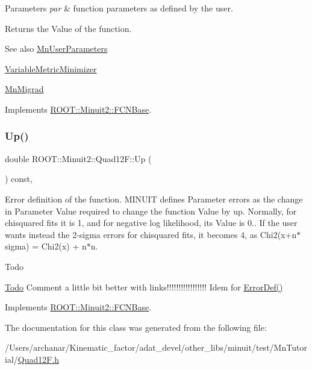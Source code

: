 \begin{DoxyParams}{Parameters}
{\em par} & function parameters as defined by the user.\\
\hline
\end{DoxyParams}
\begin{DoxyReturn}{Returns}
the Value of the function.
\end{DoxyReturn}
\begin{DoxySeeAlso}{See also}
\mbox{\hyperlink{classROOT_1_1Minuit2_1_1MnUserParameters}{Mn\+User\+Parameters}} 

\mbox{\hyperlink{classROOT_1_1Minuit2_1_1VariableMetricMinimizer}{Variable\+Metric\+Minimizer}} 

\mbox{\hyperlink{classROOT_1_1Minuit2_1_1MnMigrad}{Mn\+Migrad}} 
\end{DoxySeeAlso}


Implements \mbox{\hyperlink{classROOT_1_1Minuit2_1_1FCNBase_ae4a86bd94d0d0f5ca6fc8f8ab2bb43cd}{R\+O\+O\+T\+::\+Minuit2\+::\+F\+C\+N\+Base}}.

\mbox{\label{classROOT_1_1Minuit2_1_1Quad12F_afbb216349fbceafc530845fe1cff5af4}} 
\subsubsection{\texorpdfstring{Up()}{Up()}}
{\footnotesize\ttfamily double R\+O\+O\+T\+::\+Minuit2\+::\+Quad12\+F\+::\+Up (\begin{DoxyParamCaption}{ }\end{DoxyParamCaption}) const\hspace{0.3cm}{\ttfamily [inline]}, {\ttfamily [virtual]}}

Error definition of the function. M\+I\+N\+U\+IT defines Parameter errors as the change in Parameter Value required to change the function Value by up. Normally, for chisquared fits it is 1, and for negative log likelihood, its Value is 0.. If the user wants instead the 2-\/sigma errors for chisquared fits, it becomes 4, as Chi2(x+n$\ast$sigma) = Chi2(x) + n$\ast$n.

\begin{DoxyRefDesc}{Todo}
\item[\mbox{\hyperlink{todo__todo000001}{Todo}}]Comment a little bit better with links!!!!!!!!!!!!!!!!! Idem for \mbox{\hyperlink{classROOT_1_1Minuit2_1_1FCNBase_ac4592475c58a65b037ba97ab5f3cba10}{Error\+Def()}}\end{DoxyRefDesc}


Implements \mbox{\hyperlink{classROOT_1_1Minuit2_1_1FCNBase_a04ef08ddad92ce8d89d498efbe021c39}{R\+O\+O\+T\+::\+Minuit2\+::\+F\+C\+N\+Base}}.



The documentation for this class was generated from the following file\+:\begin{DoxyCompactItemize}
\item 
/\+Users/archanar/\+Kinematic\+\_\+factor/adat\+\_\+devel/other\+\_\+libs/minuit/test/\+Mn\+Tutorial/\mbox{\hyperlink{Quad12F_8h}{Quad12\+F.\+h}}\end{DoxyCompactItemize}

